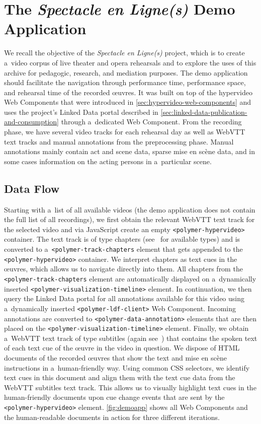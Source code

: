 \documentclass[runningheads,a4paper]{llncs}
\begin{document}
\section{The \emph{Spectacle en Ligne(s)} Demo Application}

We recall the objective of the \emph{Spectacle en Ligne(s)} project,
which  is to create a~video corpus of live theater and opera rehearsals
and to explore the uses of this archive for pedagogic, research, and mediation purposes.
The demo application should facilitate the navigation through performance time,
performance space, and rehearsal time of the recorded œuvres.
It was built on top of the hypervideo Web Components
that were introduced in \autoref{sec:hypervideo-web-components}
and uses the project's Linked Data portal described in
\autoref{sec:linked-data-publication-and-consumption} through a~dedicated Web Component.
From the recording phase, we have several video tracks for each rehearsal day
as well as WebVTT text tracks and manual annotations from the preprocessing phase.
Manual annotations mainly contain act and scene data, sparse mise en scène data,
and in some cases information on the acting persons in a~particular scene.

\subsection{Data Flow}

Starting with a~list of all available videos
(the demo application does not contain the full list of all recordings),
we first obtain the relevant WebVTT text track for the selected video
and via JavaScript create an empty \texttt{<polymer-hypervideo>} container.
The text track is of type chapters (see~\cite{pfeiffer2013webvtt} for available types)
and is converted to a~\texttt{<polymer-track-chapters} element
that gets appended to the \texttt{<polymer-hypervideo>} container.
We interpret chapters as text cues in the œuvres, which allows us to navigate directly into them.
All chapters from the \texttt{<polymer-track-chapters} element are automatically displayed
on a~dynamically inserted \texttt{<polymer-visualization-timeline>} element.
In continuation, we then query the Linked Data portal for all annotations available for this video
using a~dynamically inserted \texttt{<polymer-ldf-client>} Web Component.
Incoming annotations are converted to \texttt{<polymer-data-annotation>} elements
that are then placed on the \texttt{<polymer-visualization-timeline>} element.
Finally, we obtain a~WebVTT text track of type subtitles (again see~\cite{pfeiffer2013webvtt})
that contains the spoken text of each text cue of the œuvre in the video in question.
We dispose of HTML documents of the recorded œuvres
that show the text and mise en scène instructions in a~human-friendly way.
Using common CSS selectors, we identify text cues in this document and align them
with the text cue data from the WebVTT subtitles text track.
This allows us to visually highlight text cues in the human-friendly documents
upon cue change events that are sent by the \texttt{<polymer-hypervideo>} element.
\autoref{fig:demoapp} shows all Web Components and the human-readable documents in action
for three different iterations.
\end{document}
